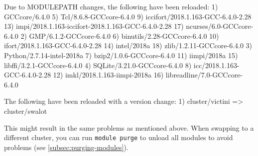 \begin{prompt}

Due to MODULEPATH changes, the following have been reloaded:
  1) GCCcore/6.4.0                   5) Tcl/8.6.8-GCCcore-6.4.0           9) iccifort/2018.1.163-GCC-6.4.0-2.28    13) impi/2018.1.163-iccifort-2018.1.163-GCC-6.4.0-2.28    17) ncurses/6.0-GCCcore-6.4.0
  2) GMP/6.1.2-GCCcore-6.4.0         6) binutils/2.28-GCCcore-6.4.0      10) ifort/2018.1.163-GCC-6.4.0-2.28       14) intel/2018a                                           18) zlib/1.2.11-GCCcore-6.4.0
  3) Python/2.7.14-intel-2018a       7) bzip2/1.0.6-GCCcore-6.4.0        11) iimpi/2018a                           15) libffi/3.2.1-GCCcore-6.4.0
  4) SQLite/3.21.0-GCCcore-6.4.0     8) icc/2018.1.163-GCC-6.4.0-2.28    12) imkl/2018.1.163-iimpi-2018a           16) libreadline/7.0-GCCcore-6.4.0

The following have been reloaded with a version change:
  1) cluster/victini => cluster/swalot
\end{prompt}

This might result in the same problems as mentioned above. When swapping to a
different cluster, you can run \lstinline|module purge| to unload all modules to avoid problems
(see \autoref{subsec:purging-modules}).

\fi
